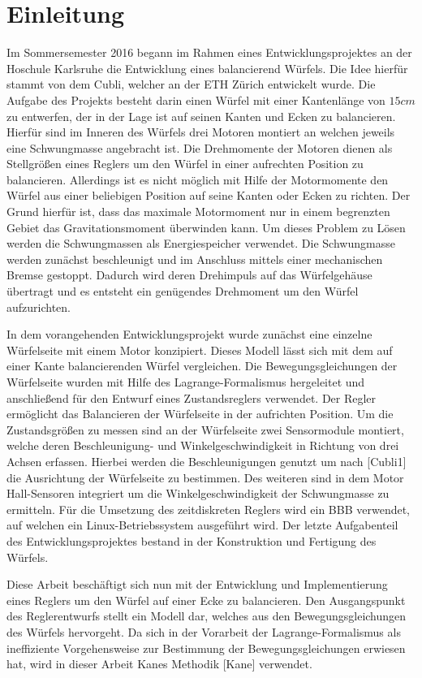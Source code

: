 \chapter{Einleitung}
Im Sommersemester 2016 begann im Rahmen eines Entwicklungsprojektes an der Hoschule Karlsruhe die Entwicklung eines balancierend Würfels. Die Idee hierfür stammt von dem Cubli, welcher an der ETH Zürich entwickelt wurde. Die Aufgabe des Projekts besteht darin einen Würfel mit einer Kantenlänge von $15cm$ zu entwerfen, der in der Lage ist auf seinen Kanten und Ecken zu balancieren. Hierfür sind im Inneren des Würfels drei Motoren montiert an welchen jeweils eine Schwungmasse angebracht ist. Die Drehmomente der Motoren dienen als Stellgrößen eines Reglers um den Würfel in einer aufrechten Position zu balancieren. Allerdings ist es nicht möglich mit Hilfe der Motormomente den Würfel aus einer beliebigen Position auf seine Kanten oder Ecken zu richten. Der Grund hierfür ist, dass das maximale Motormoment nur in einem begrenzten Gebiet das Gravitationsmoment überwinden kann. Um dieses Problem zu Lösen werden die Schwungmassen als Energiespeicher verwendet. Die Schwungmasse werden zunächst beschleunigt und im Anschluss mittels einer mechanischen Bremse gestoppt. Dadurch wird deren Drehimpuls auf das Würfelgehäuse übertragt und es entsteht ein genügendes Drehmoment um den Würfel aufzurichten.

In dem vorangehenden Entwicklungsprojekt wurde zunächst eine einzelne Würfelseite mit einem Motor konzipiert. Dieses Modell lässt sich mit dem auf einer Kante balancierenden Würfel vergleichen. Die Bewegungsgleichungen der Würfelseite wurden mit Hilfe des Lagrange-Formalismus hergeleitet und anschließend für den Entwurf eines Zustandsreglers verwendet. Der Regler ermöglicht das Balancieren der Würfelseite in der aufrichten Position. Um die Zustandsgrößen zu messen sind an der Würfelseite zwei Sensormodule montiert, welche deren Beschleunigung- und Winkelgeschwindigkeit in Richtung von drei Achsen erfassen. Hierbei werden die Beschleunigungen genutzt um nach [Cubli1] die Ausrichtung der Würfelseite zu bestimmen. Des weiteren sind in dem Motor Hall-Sensoren integriert um die Winkelgeschwindigkeit der Schwungmasse zu ermitteln. Für die Umsetzung des zeitdiskreten Reglers wird ein \ac{BBB} verwendet, auf welchen ein Linux-Betriebssystem ausgeführt wird. Der letzte Aufgabenteil des Entwicklungsprojektes bestand in der Konstruktion und Fertigung des Würfels.

Diese Arbeit beschäftigt sich nun mit der Entwicklung und Implementierung eines Reglers um den Würfel auf einer Ecke zu balancieren. Den Ausgangspunkt des Reglerentwurfs stellt ein Modell dar, welches aus den Bewegungsgleichungen des Würfels hervorgeht. Da sich in der Vorarbeit der Lagrange-Formalismus als ineffiziente Vorgehensweise zur Bestimmung der Bewegungsgleichungen erwiesen hat, wird in dieser Arbeit Kanes Methodik [Kane] verwendet.


